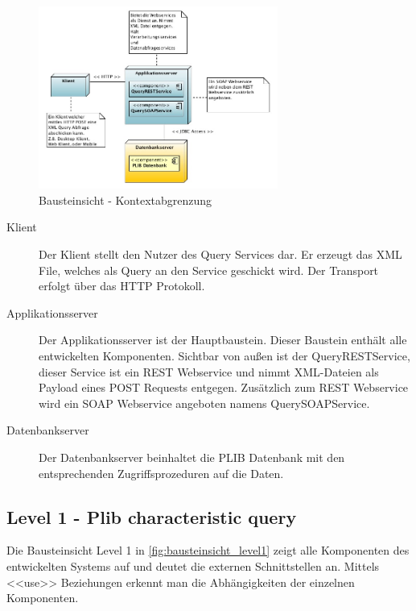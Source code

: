 \begin{figure}[!htbp]
	\centering
		\includegraphics[width=0.7\textwidth]{images/bausteinsicht_plib_level0.jpg}
	\caption{Bausteinsicht - Kontextabgrenzung}
	\label{fig:bausteinsicht_level0}
\end{figure}

\begin{description}
\item[Klient] Der Klient stellt den Nutzer des Query Services dar. Er erzeugt das XML File, welches als Query an den Service geschickt wird. Der Transport erfolgt über das HTTP Protokoll. 
\item[Applikationsserver] Der Applikationsserver ist der Hauptbaustein. Dieser Baustein enthält alle entwickelten Komponenten. Sichtbar von außen ist der QueryRESTService, dieser Service ist ein \gls{REST} \gls{Webservice} und nimmt XML-Dateien als Payload eines POST Requests entgegen. Zusätzlich zum \gls{REST}  \gls{Webservice} wird ein \gls{SOAP} \gls{Webservice} angeboten namens QuerySOAPService. 
\item[Datenbankserver] Der Datenbankserver beinhaltet die PLIB Datenbank mit den entsprechenden Zugriffsprozeduren auf die Daten. 
\end{description}

\subsection{Level 1 - Plib characteristic query} 

Die Bausteinsicht Level 1 in \autoref{fig:bausteinsicht_level1} zeigt alle Komponenten des entwickelten Systems auf und deutet die externen Schnittstellen an. Mittels <<use>> Beziehungen erkennt man die Abhängigkeiten der einzelnen Komponenten. 

